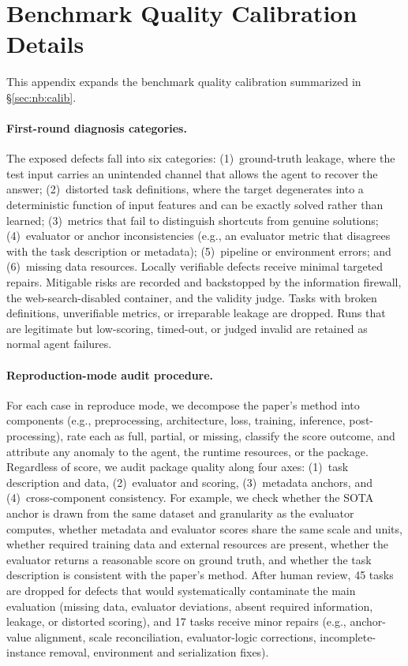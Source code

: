 \documentclass{llmxive}
\begin{document}
\section{Benchmark Quality Calibration Details}
\label{app:calibration-details}

This appendix expands the benchmark quality calibration summarized in \S\ref{sec:nb:calib}.

\paragraph{First-round diagnosis categories.}
The exposed defects fall into six categories: (1)~ground-truth leakage, where the test input carries an unintended channel that allows the agent to recover the answer; (2)~distorted task definitions, where the target degenerates into a deterministic function of input features and can be exactly solved rather than learned; (3)~metrics that fail to distinguish shortcuts from genuine solutions; (4)~evaluator or anchor inconsistencies (e.g., an evaluator metric that disagrees with the task description or metadata); (5)~pipeline or environment errors; and (6)~missing data resources.
Locally verifiable defects receive minimal targeted repairs. Mitigable risks are recorded and backstopped by the information firewall, the web-search-disabled container, and the validity judge. Tasks with broken definitions, unverifiable metrics, or irreparable leakage are dropped. Runs that are legitimate but low-scoring, timed-out, or judged invalid are retained as normal agent failures.

\paragraph{Reproduction-mode audit procedure.}
For each case in reproduce mode, we decompose the paper's method into components (e.g., preprocessing, architecture, loss, training, inference, post-processing), rate each as full, partial, or missing, classify the score outcome, and attribute any anomaly to the agent, the runtime resources, or the package.
Regardless of score, we audit package quality along four axes: (1)~task description and data, (2)~evaluator and scoring, (3)~metadata anchors, and (4)~cross-component consistency. For example, we check whether the SOTA anchor is drawn from the same dataset and granularity as the evaluator computes, whether metadata and evaluator scores share the same scale and units, whether required training data and external resources are present, whether the evaluator returns a reasonable score on ground truth, and whether the task description is consistent with the paper's method.
After human review, 45 tasks are dropped for defects that would systematically contaminate the main evaluation (missing data, evaluator deviations, absent required information, leakage, or distorted scoring), and 17 tasks receive minor repairs (e.g., anchor-value alignment, scale reconciliation, evaluator-logic corrections, incomplete-instance removal, environment and serialization fixes).
\end{document}
